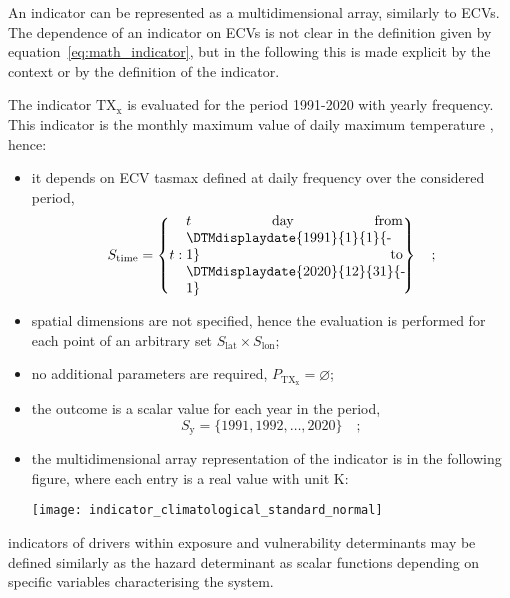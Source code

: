 An \gls{indicator} can be represented as a multidimensional array, similarly to \glspl{ECV}.
The dependence of an \gls{indicator} on \glspl{ECV} is not clear in the definition given by equation~\eqref{eq:math_indicator}, but in the following this is made explicit by the context or by the definition of the \gls{indicator}.

\begin{example}
  The \gls{indicator} $\mathrm{TX_x}$ is evaluated for the period 1991-2020 with yearly frequency. This \gls{indicator} is the monthly maximum value of daily maximum temperature \cite{ETCCDIClimate}, hence:
  \begin{itemize}
    \item it depends on \gls{ECV} \glsdesc{tasmax} defined at daily frequency over the considered period,
      \begin{equation*}
        S_\text{time} = \left\{ t : \parbox{0.45\linewidth}{$t$ day from \DTMdisplaydate{1991}{1}{1}{-1} to \DTMdisplaydate{2020}{12}{31}{-1}} \right\}
        \quad ;
      \end{equation*}
    \item spatial dimensions are not specified, hence the evaluation is performed for each point of an arbitrary set $S_\text{lat} \times S_\text{lon}$;
    \item no additional parameters are required, $P_\mathrm{TX_x} = \varnothing$;
    \item the outcome is a scalar value for each year in the period,
      \begin{equation*}
        S_\text{y} = \{ 1991, 1992, \dots, 2020 \}
        \quad ;
      \end{equation*}
    \item the multidimensional array representation of the \gls{indicator} is in the following figure, where each entry is a real value with unit \unit{\kelvin}:
      \begin{center}
        \texttt{[image: indicator\_climatological\_standard\_normal]}
      \end{center}
  \end{itemize}
\end{example}

\Glspl{indicator} of \glspl{driver} within \gls{exposure} and \gls{vulnerability} \glspl{determinant} may be defined similarly as the \gls{hazard} \gls{determinant} as scalar functions depending on specific variables characterising the system.



